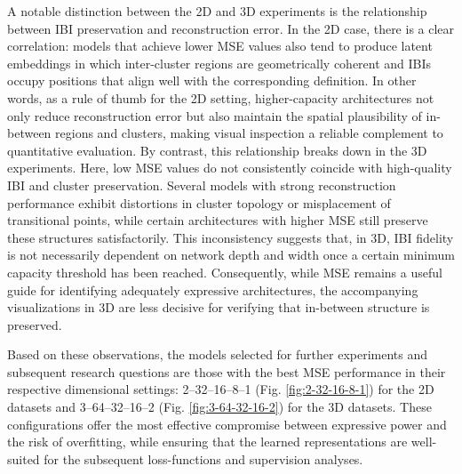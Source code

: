 A notable distinction between the 2D and 3D experiments is the relationship between IBI preservation and reconstruction error. In the 2D case, there is a clear correlation: models that achieve lower MSE values also tend to produce latent embeddings in which inter-cluster regions are geometrically coherent and IBIs occupy positions that align well with the corresponding definition. In other words, as a rule of thumb for the 2D setting, higher-capacity architectures not only reduce reconstruction error but also maintain the spatial plausibility of in-between regions and clusters, making visual inspection a reliable complement to quantitative evaluation. By contrast, this relationship breaks down in the 3D experiments. Here, low MSE values do not consistently coincide with high-quality IBI and cluster preservation. Several models with strong reconstruction performance exhibit distortions in cluster topology or misplacement of transitional points, while certain architectures with higher MSE still preserve these structures satisfactorily. This inconsistency suggests that, in 3D, IBI fidelity is not necessarily dependent on network depth and width once a certain minimum capacity threshold has been reached. Consequently, while MSE remains a useful guide for identifying adequately expressive architectures, the accompanying visualizations in 3D are less decisive for verifying that in-between structure is preserved. 

Based on these observations, the models selected for further experiments and subsequent research questions are those with the best MSE performance in their respective dimensional settings: 2–32–16–8–1 (Fig. \ref{fig:2-32-16-8-1}) for the 2D datasets and 3–64–32–16–2 (Fig. \ref{fig:3-64-32-16-2}) for the 3D datasets. These configurations offer the most effective compromise between expressive power and the risk of overfitting, while ensuring that the learned representations are well-suited for the subsequent loss-functions and supervision analyses.
